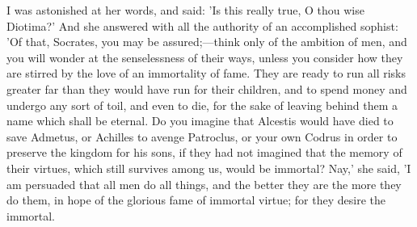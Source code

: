 \para[119] I was astonished at her words, and said: 'Is this really true, O thou wise Diotima?' And she answered with all the authority of an accomplished sophist: 'Of that, Socrates, you may be assured;---think only of the ambition of men, and you will wonder at the senselessness of their ways, unless you consider how they are stirred by the love of an immortality of fame. They are ready to run all risks greater far than they would have run for their children, and to spend money and undergo any sort of toil, and even to die, for the sake of leaving behind them a name which shall be eternal. Do you imagine that Alcestis would have died to save Admetus, or Achilles to avenge Patroclus, or your own Codrus in order to preserve the kingdom for his sons, if they had not imagined that the memory of their virtues, which still survives among us, would be immortal? Nay,' she said, 'I am persuaded that all men do all things, and the better they are the more they do them, in hope of the glorious fame of immortal virtue; for they desire the immortal.

